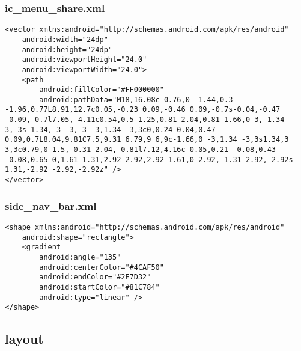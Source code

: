 \subsubsection{ic\_menu\_share.xml}
\begin{lstlisting}
<vector xmlns:android="http://schemas.android.com/apk/res/android"
    android:width="24dp"
    android:height="24dp"
    android:viewportHeight="24.0"
    android:viewportWidth="24.0">
    <path
        android:fillColor="#FF000000"
        android:pathData="M18,16.08c-0.76,0 -1.44,0.3 -1.96,0.77L8.91,12.7c0.05,-0.23 0.09,-0.46 0.09,-0.7s-0.04,-0.47 -0.09,-0.7l7.05,-4.11c0.54,0.5 1.25,0.81 2.04,0.81 1.66,0 3,-1.34 3,-3s-1.34,-3 -3,-3 -3,1.34 -3,3c0,0.24 0.04,0.47 0.09,0.7L8.04,9.81C7.5,9.31 6.79,9 6,9c-1.66,0 -3,1.34 -3,3s1.34,3 3,3c0.79,0 1.5,-0.31 2.04,-0.81l7.12,4.16c-0.05,0.21 -0.08,0.43 -0.08,0.65 0,1.61 1.31,2.92 2.92,2.92 1.61,0 2.92,-1.31 2.92,-2.92s-1.31,-2.92 -2.92,-2.92z" />
</vector>
\end{lstlisting}

\subsubsection{side\_nav\_bar.xml}
\begin{lstlisting}
<shape xmlns:android="http://schemas.android.com/apk/res/android"
    android:shape="rectangle">
    <gradient
        android:angle="135"
        android:centerColor="#4CAF50"
        android:endColor="#2E7D32"
        android:startColor="#81C784"
        android:type="linear" />
</shape>
\end{lstlisting}

\subsection{layout}
